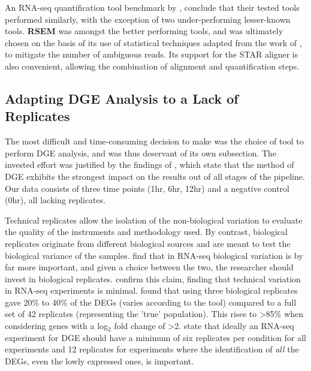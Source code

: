 An RNA-seq quantification tool benchmark by \cite{Teng2016} \cite{teng2016benchmark} \citep{Teng2016second}, conclude that their tested tools performed similarly, with the exception of two under-performing lesser-known tools. \textbf{RSEM} was amongst the better performing tools, and was ultimately chosen on the basis of its use of statistical techniques adapted from the work of \cite{li2010rna}, to mitigate the number of ambiguous reads. Its support for the STAR aligner is also convenient, allowing the combination of alignment and quantification steps. 


\subsection{Adapting DGE Analysis to a Lack of Replicates}
\label{DGE no replicates}

The most difficult and time-consuming decision to make was the choice of tool to perform \ac{DGE} analysis, and was thus deservant of its own subsection. The invested effort was justified by the findings of \cite{williams2017empirical}, which state that the method of \ac{DGE} exhibits the strongest impact on the results out of all stages of the pipeline. Our data consists of three time points (1hr, 6hr, 12hr) and a negative control (0hr), all lacking replicates. 

Technical replicates allow the isolation of the non-biological variation to evaluate the quality of the instruments and methodology used. By contrast, biological replicates originate from different biological sources and are meant to test the biological variance of the samples. \cite{liu2014rna} find that in RNA-seq biological variation is by far more important, and given a choice between the two, the researcher should invest in biological replicates. \cite{bullard2010evaluation} confirm this claim, finding that technical variation in RNA-seq experiments is minimal. \cite{schurch2016many} found that using three biological replicates gave 20\% to 40\% of the \ac{DEG}s (varies according to the tool) compared to a full set of 42 replicates (representing the 'true' population). This rises to >85\% when considering genes with a log$_2$ fold change of >2. \cite{schurch2016many} state that ideally an RNA-seq experiment for \ac{DGE} should have a minimum of six replicates per condition for all experiments and 12 replicates for experiments where the identification of \textit{all} the \ac{DEG}s, even the lowly expressed ones, is important. 

